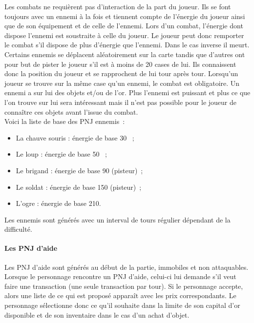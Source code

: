 \documentclass[11pt]{article}
\begin{document}
Les combats ne requièrent pas d'interaction de la part du joueur. Ils se font toujours avec un ennemi à la fois et tiennent compte de l'énergie du joueur ainsi que de son équipement et de celle de l'ennemi. Lors d'un combat, l'énergie dont dispose l'ennemi est soustraite à celle du joueur. Le joueur peut donc remporter le combat s'il dispose de plus d'énergie que l'ennemi. Dans le cas inverse il meurt.\\
Certains ennemis se déplacent aléatoirement sur la carte tandis que d'autres ont pour but de pister le joueur s'il est à moins de 20 cases de lui. Ils connaissent donc la position du joueur et se rapprochent de lui tour après tour. Lorsqu'un joueur se trouve sur la même case qu'un ennemi, le combat est obligatoire. Un ennemi a sur lui des objets et/ou de l'or. Plus l'ennemi est puissant et plus ce que l'on trouve sur lui sera intéressant mais il n'est pas possible pour le joueur de connaître ces objets avant l'issue du combat.\\
Voici la liste de base des PNJ ennemis~:

\begin{itemize}
    \item La chauve souris : énergie de base 30 ~;
    \item Le loup : énergie de base 50 ~;
    \item Le brigand : énergie de base 90 (pisteur)~;
    \item Le soldat : énergie de base 150 (pisteur)~;
    \item L'ogre : énergie de base 210.
\end{itemize}

Les ennemis sont générés avec un interval de tours régulier dépendant de la difficulté.

\paragraph{Les PNJ d'aide}

Les PNJ d'aide sont générés au début de la partie, immobiles et non attaquables. Lorsque le personnage rencontre un PNJ d'aide, celui-ci lui demande s’il veut faire une transaction (une seule transaction par tour). Si le personnage accepte, alors une liste de ce qui est proposé apparaît avec les prix correspondants. Le personnage sélectionne donc ce qu’il souhaite dans la limite de son capital d’or disponible et de son inventaire dans le cas d'un achat d'objet.
\end{document}
